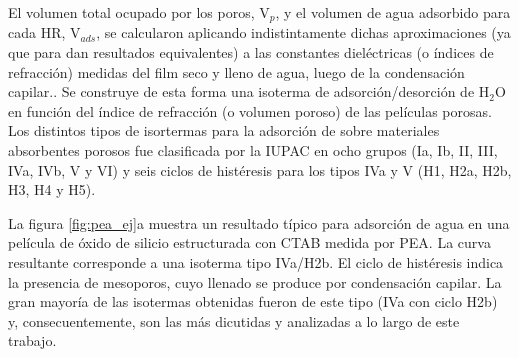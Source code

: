 		El volumen total ocupado por los poros, V$_p$, y el volumen de agua adsorbido para cada HR, V$_{ads}$, se calcularon aplicando indistintamente dichas aproximaciones (ya que para \pdm\space dan resultados equivalentes) a las constantes dieléctricas (o índices de refracción) medidas del film seco y lleno de agua, luego de la condensación capilar.\cite{Angelome2008,Fuertes2009,Nano-compuestas2013}. Se construye de esta forma una isoterma de adsorción/desorción de H$_2$O en función del índice de refracción (o volumen poroso) de las películas porosas. Los distintos tipos de isortermas para la adsorción de sobre materiales absorbentes porosos fue clasificada por la IUPAC en ocho grupos (Ia, Ib, II, III, IVa, IVb, V y VI) y seis ciclos de histéresis para los tipos IVa y V (H1, H2a, H2b, H3, H4 y H5). \cite{Thommes2015}

		La figura \ref{fig:pea_ej}a muestra un resultado típico para adsorción de agua en una película de óxido de silicio estructurada con CTAB medida por PEA. La curva resultante corresponde a una isoterma tipo IVa/H2b. El ciclo de histéresis indica la presencia de mesoporos, cuyo llenado se produce por condensación capilar. \cite{Gregg1967}La gran mayoría de las isotermas obtenidas fueron de este tipo (IVa con ciclo H2b) y, consecuentemente, son las más dicutidas y analizadas a lo largo de este trabajo. 

